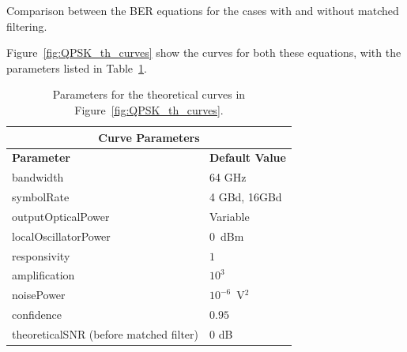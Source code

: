 \begin{refsection}
\begin{table}[H]
	\caption{Comparison between the BER equations for the cases with and without matched filtering.\label{tab:ber_qpsk}}
\end{table}

Figure~\ref{fig:QPSK_th_curves} show the curves for both these equations, with the parameters listed in Table~\ref{tab:thCurves}.

\begin{table}[H]
	\centering
	\begin{tabular}{|l|l|}
		\hline
		\multicolumn{2}{|c|}{ \textbf{Curve Parameters} } \\
		\hline
		\textbf{Parameter}     & \textbf{Default Value}                                     \\\hline
		bandwidth              & 64 GHz															\\\hline
		symbolRate		       & 4 GBd, 16GBd		\\\hline
		outputOpticalPower     & Variable                                                   \\ \hline
		localOscillatorPower   & $0$~dBm                                                    \\ \hline
		responsivity           & $1$                                                        \\ \hline
		amplification          & $10^3$                                                     \\ \hline
		noisePower			   & $10^{-6}$~V$^2$                             					\\ \hline
		confidence             & $0.95$                                                     \\ \hline
		theoreticalSNR (before matched filter) &	0 dB								    \\ \hline
	\end{tabular}
	\caption{Parameters for the theoretical curves in Figure~\ref{fig:QPSK_th_curves}.\label{tab:thCurves}}
\end{table}


\end{refsection}
